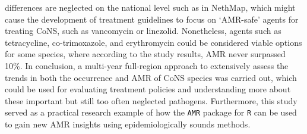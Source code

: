 \documentclass[
]{book}
\begin{document}
differences are neglected on the national level such as in NethMap, which might cause the development of treatment guidelines to focus on `AMR-safe' agents for treating CoNS, such as vancomycin or linezolid. Nonetheless, agents such as tetracycline, co-trimoxazole, and erythromycin could be considered viable options for some species, where according to the study results, AMR never surpassed 10\%. In conclusion, a multi-year full-region approach to extensively assess the trends in both the occurrence and AMR of CoNS species was carried out, which could be used for evaluating treatment policies and understanding more about these important but still too often neglected pathogens. Furthermore, this study served as a practical research example of how the \texttt{AMR} package for \texttt{R} can be used to gain new AMR insights using epidemiologically sounds methods.
\end{document}
